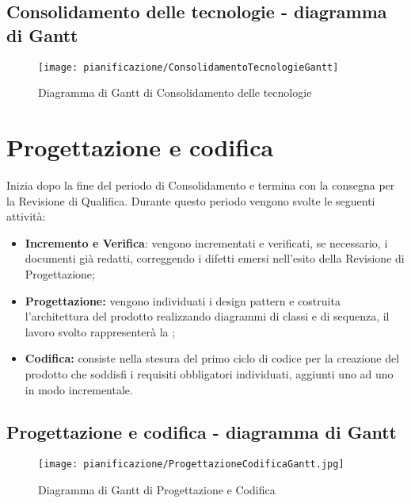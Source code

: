 \documentclass[../PianodiProgetto.tex]{subfiles}
\begin{document}
	\subsection{Consolidamento delle tecnologie - diagramma di Gantt}
	\begin{figure}[H]
		\texttt{[image: pianificazione/ConsolidamentoTecnologieGantt]}	
		\caption{Diagramma di Gantt di Consolidamento delle tecnologie}\label{fig:3}
	\end{figure}

	\newpage
	\section{Progettazione e codifica}
	Inizia dopo la fine del periodo di Consolidamento e termina con la consegna per la Revisione di Qualifica. Durante questo periodo vengono svolte le seguenti attività:
	\begin{itemize}
		\item \textbf{Incremento e Verifica}: vengono incrementati e verificati, se necessario, i documenti già redatti, correggendo i difetti emersi nell'esito della Revisione di Progettazione;	
		\item \textbf{Progettazione:} vengono individuati i design pattern e costruita l'architettura del prodotto realizzando diagrammi di classi e di sequenza, il lavoro svolto rappresenterà la ;
		\item \textbf{Codifica:} consiste nella stesura del primo ciclo di codice per la creazione del prodotto che soddisfi i requisiti obbligatori individuati, aggiunti uno ad uno in modo incrementale.
	\end{itemize}
	\subsection{Progettazione e codifica - diagramma di Gantt}
	\begin{figure}[H]
		\texttt{[image: pianificazione/ProgettazioneCodificaGantt.jpg]}	
		\caption{Diagramma di Gantt di Progettazione e Codifica}\label{fig:4}	
	\end{figure}

	\newpage
\end{document}
